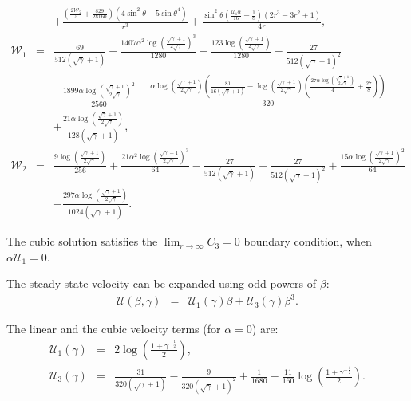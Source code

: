 \documentclass[final]{elsarticle}
\newcommand{\pars}[1]{\left(#1\right)}
\newcommand\cU{\mathscr{U}}
\newcommand\cW{\mathscr{W}}
\begin{document}
\begin{appendix}
\begin{eqnarray*}
\\ && + \frac{\left(\frac{2 {\cW_2}}{5} + \frac{829}{28160}\right) \left(4 {\sin^2\theta} - 5 {\sin\theta}^4\right)}{r^3} + \frac{{\sin^2\theta} \left(\frac{{\cU_1}\alpha}{16} - \frac{1}{8}\right) \left(2 r^3 - 3 r^2 + 1\right)}{4 r},
\\
\cW_1 &=& \frac{69}{512 \left(\sqrt{\gamma} + 1\right)} - \frac{1407\alpha^2 {\log\left(\frac{\sqrt{\gamma} + 1}{2 \sqrt{\gamma}}\right)}^3}{1280} - \frac{123 \log\left(\frac{\sqrt{\gamma} + 1}{2 \sqrt{\gamma}}\right)}{1280} - \frac{27}{512 {\left(\sqrt{\gamma} + 1\right)}^2} \\ && -
\frac{1899\alpha {\log\left(\frac{\sqrt{\gamma} + 1}{2 \sqrt{\gamma}}\right)}^2}{2560} - \frac{\alpha \log\left(\frac{\sqrt{\gamma} + 1}{2 \sqrt{\gamma}}\right) \left(\frac{81}{16 \left(\sqrt{\gamma} + 1\right)} - \log\left(\frac{\sqrt{\gamma} + 1}{2 \sqrt{\gamma}}\right) \left(\frac{27\alpha \log\left(\frac{\sqrt{\gamma} + 1}{2 \sqrt{\gamma}}\right)}{4} + \frac{27}{8}\right)\right)}{320} \\ && + 
\frac{21\alpha \log\left(\frac{\sqrt{\gamma} + 1}{2 \sqrt{\gamma}}\right)}{128 \left(\sqrt{\gamma} + 1\right)},
\\
\cW_2 &=& \frac{9 \log\left(\frac{\sqrt{\gamma} + 1}{2 \sqrt{\gamma}}\right)}{256} + \frac{21\alpha^2 {\log\left(\frac{\sqrt{\gamma} + 1}{2 \sqrt{\gamma}}\right)}^3}{64} - \frac{27}{512 \left(\sqrt{\gamma} + 1\right)} - \frac{27}{512 {\left(\sqrt{\gamma} + 1\right)}^2}
 + \frac{15\alpha {\log\left(\frac{\sqrt{\gamma} + 1}{2 \sqrt{\gamma}}\right)}^2}{64} 
\\ && 
- \frac{297\alpha \log\left(\frac{\sqrt{\gamma} + 1}{2 \sqrt{\gamma}}\right)}{1024 \left(\sqrt{\gamma} + 1\right)}.
\end{eqnarray*}

The cubic solution satisfies the $\lim_{r\rightarrow\infty}C_3 = 0$ boundary condition, 
when $\alpha\cU_1 = 0$.

The steady-state velocity can be expanded using odd powers of $\beta$:
\begin{eqnarray*}
\cU(\beta, \gamma) &=& \cU_1(\gamma) \beta + \cU_3(\gamma) \beta^3.
\end{eqnarray*}

The linear and the cubic velocity terms (for $\alpha = 0$) are:
\begin{eqnarray*}
\cU_1(\gamma) &=& 2 \log \pars{\frac{1 + \gamma^{-\frac{1}{2}}}{2}}, \\
\cU_3(\gamma) &=& \frac{31}{320(\sqrt\gamma + 1)} - \frac{9}{320(\sqrt\gamma + 1)^2} + \frac{1}{1680} - \frac{11}{160} \log \pars{\frac{1 + \gamma^{-\frac{1}{2}}}{2}}.
\end{eqnarray*}


\end{appendix}
\end{document}
